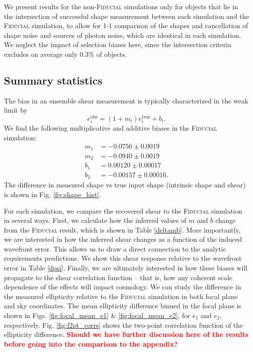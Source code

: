 \documentclass[aps,prd, amsmath,amssymb,superscriptaddress,showkeys,nofootinbib,reprint,preprintnumbers]{revtex4-1}
\newcommand{\verify}[1]{\textcolor{red}{\textbf{{#1}}}}
\begin{document}
We present results for the non-\textsc{Fiducial} simulations only for objects that lie in the intersection of successful shape measurement between each simulation and the \textsc{Fiducial} simulation, to allow for 1-1 comparison of the shapes and cancellation of shape noise and sources of photon noise, which are identical in each simulation. 
We neglect the impact of selection biases here, since the intersection criteria excludes on average only 0.3\% of objects.

\subsection{Summary statistics}

The bias in an ensemble shear measurement is typically characterized in the weak limit by 
\begin{equation}
e_i^{\mathrm{obs}} = (1+m_i) e_i^{\mathrm{true}} + b_i.
\end{equation}
We find the following multiplicative and additive biases in the \textsc{Fiducial} simulation: 
\begin{align*}
m_1 &= -0.0756 \pm 0.0019\\ 
m_2 &= -0.0940 \pm 0.0019\\ 
b_1 &= 0.00120 \pm 0.00017\\
b_2 &= -0.00157 \pm 0.00016.
\end{align*}
The difference in measured shape vs true input shape (intrinsic shape and shear) is shown in Fig. \ref{fig:shape_hist}.

For each simulation, we compare the recovered shear to the \textsc{Fiducial} simulation in several ways. First, we calculate how the inferred values of $m$ and $b$ change from the \textsc{Fiducial} result, which is shown in Table \ref{deltamb}. More importantly, we are interested in how the inferred shear changes as a function of the induced wavefront error. This allows us to draw a direct connection to the analytic requirements predictions. We show this shear response relative to the wavefront error in Table \ref{dpsi}. Finally, we are ultimately interested in how these biases will propagate to the shear correlation function -- that is, how any coherent scale dependence of the effects will impact cosmology. We can study the difference in the measured ellipticity relative to the \textsc{Fiducial} simulation in both focal plane and sky coordinates. The mean ellipticity difference binned in the focal plane is shown in Figs. \ref{fig:focal_mean_e1}  \& \ref{fig:focal_mean_e2}, for $e_1$ and $e_2$, respectively. Fig. \ref{fig:f2pt_corrs} shows the two-point correlation function of the ellipticity difference. 
\verify{Should we have further discussion here of the results before going into the comparison to the appendix?}
\end{document}
